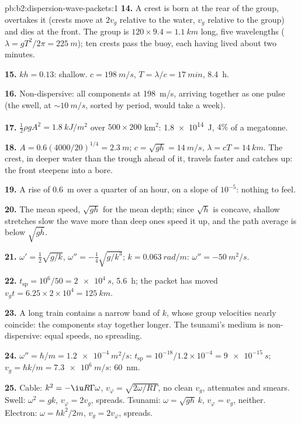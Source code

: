 \begin{solution}{pb:b2:dispersion-wave-packets:1}
\textbf{14.} A crest is born at the rear of the group, overtakes it
(crests move at $2v_g$ relative to the water, $v_g$ relative to the
group) and dies at the front. The group is $120 \times 9.4 = \qty{1.1}{km}$
long, five wavelengths ($\lambda = gT^2/2\pi = \qty{225}{m}$); ten crests pass the
buoy, each having lived about two minutes.

\textbf{15.} $kh = 0.13$: shallow. $c = \qty{198}{m/s}$, $T = \lambda/c = \qty{17}{min}$,
\qty{8.4}{h}.

\textbf{16.} Non-dispersive: all components at \qty{198}{m/s}, arriving
together as one pulse (the swell, at $\sim\qty{10}{m/s}$, sorted by period,
would take a week).

\textbf{17.} $\tfrac12\rho gA^2 = \qty{1.8}{kJ/m^2}$ over $500 \times 200$ km$^2$: \qty{1.8e14}{J},
$4\%$ of a megatonne.

\textbf{18.} $A = 0.6(4000/20)^{1/4} = \qty{2.3}{m}$; $c = \sqrt{gh} = \qty{14}{m/s}$, $\lambda =
cT = \qty{14}{km}$. The crest, in deeper water than the trough ahead of it,
travels faster and catches up: the front steepens into a bore.

\textbf{19.} A rise of \qty{0.6}{m} over a quarter of an hour, on a slope
of $10^{-5}$: nothing to feel.

\textbf{20.} The mean speed, $\sqrt{gh}$ for the mean depth; since
$\sqrt h$ is concave, shallow stretches slow the wave more than deep
ones speed it up, and the path average is below $\sqrt{g\bar h}$.

\textbf{21.} $\omega' = \tfrac12\sqrt{g/k}$, $\omega'' = -\tfrac14\sqrt{g/k^3}$; $k = \qty{0.063}{rad/m}$:
$\omega'' = \qty{-50}{m^2/s}$.

\textbf{22.} $t_{\text{sp}} = 10^6/50 = \qty{2e4}{s}$, \qty{5.6}{h}; the packet has
moved $v_gt = 6.25 \times 2 \times 10^4 = \qty{125}{km}$.

\textbf{23.} A long train contains a narrow band of $k$, whose group
velocities nearly coincide: the components stay together longer. The
tsunami's medium is non-dispersive: equal speeds, no spreading.

\textbf{24.} $\omega'' = \hbar/m = \qty{1.2e-4}{m^2/s}$: $t_{\text{sp}} = 10^{-18}/1.2 \times
10^{-4} = \qty{9e-15}{s}$; $v_g = \hbar k/m = \qty{7.3e6}{m/s}$: \qty{60}{nm}.

\textbf{25.} Cable: $k^2 = -\iu R\Gamma\omega$, $v_\varphi = \sqrt{2\omega/R\Gamma}$, no
clean $v_g$, attenuates and smears. Swell: $\omega^2 = gk$, $v_\varphi = 2v_g$,
spreads. Tsunami: $\omega = \sqrt{gh}\,k$, $v_\varphi = v_g$, neither. Electron:
$\omega = \hbar k^2/2m$, $v_g = 2v_\varphi$, spreads.
\end{solution}
